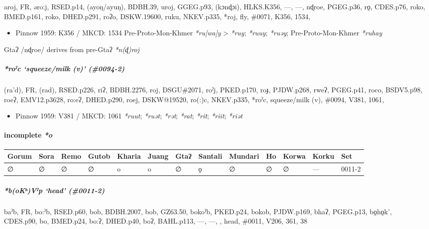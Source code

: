 \documentclass[a4paper,]{article}
\providecommand{\tightlist}{%
  \setlength{\itemsep}{0pt}\setlength{\parskip}{0pt}}
\let\oldparagraph\paragraph
\renewcommand{\paragraph}[1]{\oldparagraph{#1}\mbox{}}
\let\oldsubparagraph\subparagraph
\renewcommand{\subparagraph}[1]{\oldsubparagraph{#1}\mbox{}}
\begin{document}
aroj, FR, əro:j, RSED.p14, (ayoŋ/ayuŋ), BDBH.39, uroj, GGEG.p93,
(kɔnɖɔi), HLKS.K356, ---, ---, nɖroe, PGEG.p36, ro̠, CDES.p76, roko,
BMED.p161, roko, DHED.p291, roʔo, DSKW.19600, ruku, NKEV.p335, *roj,
fly, \#0071, K356, 1534,

\begin{itemize}
\tightlist
\item
  Pinnow 1959: K356 / MKCD: 1534 Pre-Proto-Mon-Khmer \emph{*ru{[}wa{]}y}
  \textgreater{} \emph{*ruy}; \emph{*ruuy}; \emph{*ruəy};
  Pre-Proto-Mon-Khmer \emph{*ruhay}
\end{itemize}

Gtaʔ /nɖroe/ derives from pre-Gtaʔ \emph{*n(ɖ)roj}

\subparagraph{\texorpdfstring{\emph{*roˀc} `squeeze/milk (v)'
(\#0094-2)}{*roˀc squeeze/milk (v) (\#0094-2)}}\label{roux2c0c-squeezemilk-v-0094-2}

(ra'd), FR, (rad), RSED.p226, riʔ, BDBH.2276, roj, DSGU\#2071, roˀj,
PKED.p170, roɟ, PJDW.p268, rweʔ, PGEG.p41, roco, BSDV5.p98, roeʔ,
EMV12.p3628, ro:eʔ, DHED.p290, roej, DSKW@19520, ro(:)c, NKEV.p335,
*roˀc, squeeze/milk (v), \#0094, V381, 1061,

\begin{itemize}
\tightlist
\item
  Pinnow 1959: V381 / MKCD: 1061 \emph{*ruut}; \emph{*ruət};
  \emph{*rət}; \emph{*rat}; \emph{*rit}; \emph{*riit}; \emph{*riət}
\end{itemize}

\paragraph{\texorpdfstring{incomplete
\emph{*o}}{incomplete *o}}\label{incomplete-o}

\begin{longtable}[]{@{}lllllllllllll@{}}
\toprule
Gorum & Sora & Remo & Gutob & Kharia & Juang & Gtaʔ & Santali & Mundari
& Ho & Korwa & Korku & Set\tabularnewline
\midrule
\endhead
∅ & ∅ & ∅ & ∅ & o & o & ∅ & o̠ & ∅ & ∅ & ∅ & --- & 0011-2\tabularnewline
\bottomrule
\end{longtable}

\subparagraph{\texorpdfstring{\emph{*b(oKʰ)Vˀp} `head'
(\#0011-2)}{*b(oKʰ)Vˀp head (\#0011-2)}}\label{bokux2b0vux2c0p-head-0011-2}

baˀb, FR, bo:ˀb, RSED.p60, bob, BDBH.2007, bob, GZ63.50, bokoˀb,
PKED.p24, bokob, PJDW.p169, bhaʔ, PGEG.p13, bo̠ho̠k', CDES.p90, bo,
BMED.p24, bo:ʔ, DHED.p40, boʔ, BAHL.p113, ---, ---, , head, \#0011,
V206, 361, 38
\end{document}
